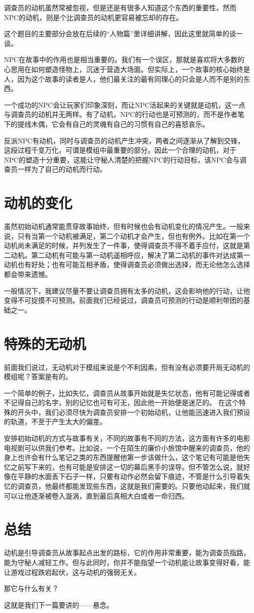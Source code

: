 \documentclass[a4paper,zihao=-4,notitlepage,twoside,openright]{ctexart}
\begin{document}
调查员的动机虽然常被忽视，但是还是有很多人知道这个东西的重要性，然而NPC的动机，则是个比调查员的动机更容易被忘却的存在。

这个题目的主要部分会放在后续的“人物篇”里详细讲解，因此这里就简单的谈一谈。

NPC在故事中的作用也是相当重要的。我们有一个误区，那就是喜欢将大多数的心思用在如何塑造怪物上，沉迷于营造大场面。但实际上，一个故事的核心始终是人，因为这个故事的读者是人，他们最关注的最有同理心的只会是人而不是别的东西。

一个成功的NPC会让玩家们印象深刻，而让NPC活起来的关键就是动机，这一点与调查员的动机并无两样。有了动机，NPC的行动也是可预测的，而不是作者笔下的提线木偶，它会有自己的灵魂有自己的习惯有自己的喜怒哀乐。

反派NPC有动机，同时与调查员的动机产生冲突，两者之间逐渐从了解到交锋，这段过程千变万化，可谓是模组中最重要的部分。因此一个合理的动机，对于NPC的塑造十分重要，这能让守秘人清楚的把握NPC的行动目标，该NPC会与调查员一样为了自己的动机而行动。

\section{动机的变化}

虽然初始动机通常能贯穿故事始终，但有时候也会有动机变化的情况产生。一般来说，只有当第一个动机被满足，第二个动机才会产生，但也有例外。比如在第一个动机尚未满足的时候，并列发生了一件事，使得调查员不得不着手应付，这就是第二动机。第二动机有可能与第一动机遥相呼应，解决了第二动机的事件对达成第一动机也有好处；也有可能互相矛盾，使得调查员必须做出选择，而无论他怎么选择都会带来遗憾。

一般情况下，我建议尽量不要让调查员拥有太多的动机，这会影响他的行动，让他变得不可捉摸不可预测。前面我们已经说过，调查员可预测的行动是顺利带团的基础之一。

\section{特殊的无动机}

前面我们说过，无动机对于模组来说是个不利因素，但有没有必须要开局无动机的模组呢？答案是有的。

一个简单的例子，比如失忆，调查员从故事开始就是失忆状态，他有可能记得或者不记得自己的名字，别的记忆也可有可无，因此他一开始便是迷茫的。 在这个特殊的开头中，我们必须尽快为调查员安排一个初始动机，让他能迅速进入我们预设的轨道，不至于产生太大的偏差。

安排初始动机的方式与故事有关，不同的故事有不同的方法，这方面有许多的电影电视剧可以供我们参考。比如说，一个在陌生的廉价小旅馆中醒来的调查员，他的身上也许会有什么笔记之类的东西提醒他第一步该做什么，这个笔记有可能是他失忆之前写下来的，也有可能是安排这一切的幕后黑手的误导。但不管怎么说，就好像在平静的水面丢下石子一样，只要有动作必然会留下痕迹，不管是什么引导着失忆的调查员，他最终都能发现些东西，这就是我们需要的。只要他动起来，我们就可以让他逐渐被卷入漩涡，直到最后真相大白或者一命归西。

\section{总结}

动机是引导调查员从故事起点出发的路标，它的作用非常重要，能为调查员指路，能为守秘人减轻工作。但与此同时，你并不能指望一个动机能让故事变得好看，能让游戏过程跌宕起伏，这与动机的强弱无关。

那它与什么有关？

这就是我们下一篇要讲的——悬念。
\end{document}
